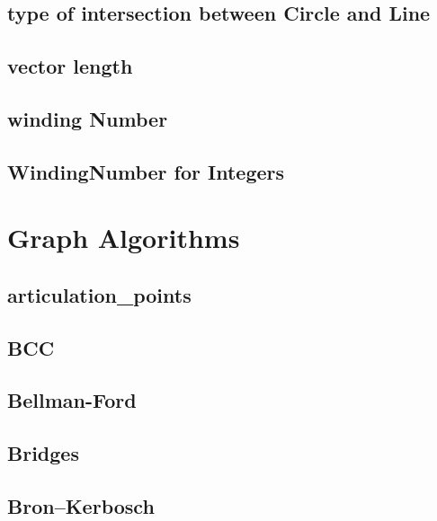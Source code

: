 ﻿\documentclass[10pt,twocolumn]{article}
\newcommand{\codefile}[1]{}}
\begin{document}
\subsection{type of intersection between Circle and Line}
\codefile{Geometry/type of intersection between Circle and Line.cpp}

\subsection{vector length}
\codefile{Geometry/vector length.cpp}

\subsection{winding Number}
\codefile{Geometry/winding Number.cpp}

\subsection{WindingNumber for Integers}
\codefile{Geometry/WindingNumber for Integers.cpp}

\section{Graph Algorithms}
\subsection{articulation\_points}
\codefile{Graph/articulation_points.cpp}

\subsection{BCC}
\codefile{Graph/BCC.cpp}

\subsection{Bellman-Ford}
\codefile{Graph/Bellman-Ford.cpp}

\subsection{Bridges}
\codefile{Graph/Bridges.cpp}

\subsection{Bron–Kerbosch}
\codefile{Graph/Bron–Kerbosch.cpp}
\end{document}
